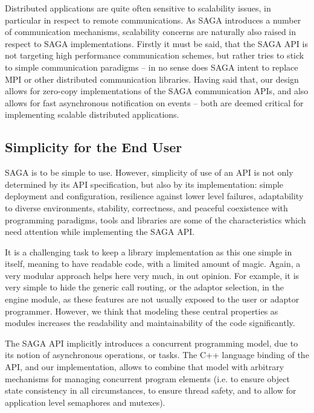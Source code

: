  Distributed applications are quite often sensitive to sca\-lability
 issues, in particular in respect to remote communications.  As SAGA
 introduces a number of communication mechanisms, scalability concerns
 are naturally also raised in respect to SAGA implementations.
 Firstly it must be said, that the SAGA API is not targeting
 high performance communication schemes, but rather tries to stick to
 simple communication paradigms -- in no sense does SAGA intent to
 replace MPI or other distributed communication libraries.  Having
 said that, our design allows for zero-copy implementations of the
 SAGA communication APIs, and also allows for fast asynchronous
 notification on events -- both are deemed critical for implementing
 scalable distributed applications.  
 


\subsection{Simplicity for the End User}

 SAGA is  to be simple to use.  However,
 simplicity of use of an API is not only determined by its API
 specification, but also by its implementation: simple deployment 
 and configuration, resilience against lower level failures,
 adaptability to diverse environments, stability, correctness, and
 peaceful coexistence with programming paradigms, tools and libraries
 are some of the characteristics which need attention while
 implementing the SAGA API.  
 
 It is a challenging task to keep a library implementation as this one
 simple in itself, meaning to have readable code, with a limited
 amount of magic.  Again, a very modular approach helps here very
 much, in out opinion.  For example, it is very simple to hide the
 generic call routing, or the adaptor selection, in the engine module,
 as these features are not usually exposed to the user or adaptor
 programmer.  However, we think that modeling these central properties
 as modules increases the readability and maintainability of the code
 significantly.  

 The SAGA API implicitly introduces a concurrent programming model,
 due to its notion of asynchronous operations, or tasks.  The C++
 language binding of the API, and our implementation, allows to combine
 that model with arbitrary mechanisms for managing concurrent program
 elements (i.e. to ensure object state consistency in all
 circumstances, to ensure thread safety, and to allow for application
 level semaphores and mutexes).


